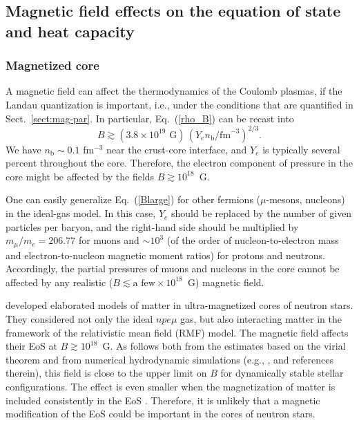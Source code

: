 \documentclass[smallextended]{svjour3}       %
\newcommand{\mel}{m_e}
\newcommand{\req}[1]{Eq.~(\ref{#1})}
\begin{document}
\subsection{Magnetic field effects on the equation of state
and heat capacity}
\label{sect:EoSmag}

\subsubsection{Magnetized core}

A magnetic field can affect the thermodynamics of the
Coulomb plasmas, if the Landau quantization is important,
i.e., under the conditions that are quantified in Sect.~\ref{sect:mag-par}.
In particular, \req{rho_B} can be recast into
\begin{equation}
   B \gtrsim (3.8\times 10^{19}\mbox{ G})\,( Y_e
   n_\mathrm{b}/\mbox{fm}^{-3})^{2/3}.
\label{Blarge}
\end{equation}
We have $n_\mathrm{b} \sim 0.1$ fm$^{-3}$ near the crust-core
interface,
and $Y_e$ is typically several percent throughout the core.
Therefore, the electron component of pressure in the
core might be affected by the fields $B\gtrsim 10^{18}$~G.

One can easily generalize \req{Blarge} for other fermions
($\mu$-mesons, nucleons) in the ideal-gas model. In this
case, $Y_e$ should be replaced by the number of given
particles per baryon, and the right-hand side should be
multiplied by $m_\mu/\mel=206.77$ for muons and $\sim10^3$
(of the order of nucleon-to-electron mass and
electron-to-nucleon magnetic moment ratios) for protons and
neutrons. Accordingly, the partial pressures of muons and
nucleons in the core cannot be affected by any realistic
($B\lesssim\mbox{a few}\times10^{18}$~G) magnetic field. 

\citet{Broderick00} developed elaborated models of matter in
ultra-magnetized cores of neutron stars. They considered not
only the ideal $npe\mu$ gas, but also interacting matter in
the framework of the relativistic mean field (RMF) model.
The magnetic field affects their EoS at $B\gtrsim10^{18}$~G.
As follows both from the estimates based on the virial
theorem \citep{LaiShapiro91} and from numerical hydrodynamic
simulations (e.g., \citealp{FriebenRezzolla12}, and
references therein), this field is close to the upper limit
on $B$ for dynamically stable stellar configurations. The effect is
even smaller when the magnetization of matter is included consistently in
the EoS \citep{Chatt15}.
Therefore, it is unlikely that a magnetic modification of
the EoS could be important in the cores of neutron stars.
\end{document}
